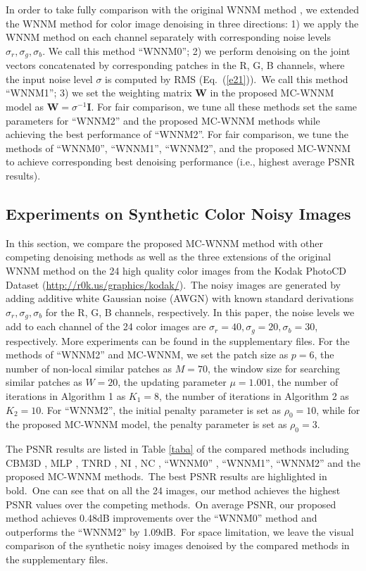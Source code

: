 \documentclass[10pt,twocolumn,letterpaper,sort&compress]{article}
\begin{document}
In order to take fully comparison with the original WNNM method \cite{wnnmijcv}, we extended the WNNM method \cite{wnnmijcv} for color image denoising in three directions: 1) we apply the WNNM method \cite{wnnmijcv} on each channel separately with corresponding noise levels $\sigma_{r}, \sigma_{g}, \sigma_{b}$. We call this method ``WNNM0''; 2) we perform denoising on the joint vectors concatenated by corresponding patches in the R, G, B channels, where the input noise level $\sigma$ is computed by RMS (Eq.\ (\ref{e21})).\ We call this method ``WNNM1''; 3) we set the weighting matrix $\mathbf{W}$ in the proposed MC-WNNM model as $\mathbf{W}=\sigma^{-1}\mathbf{I}$. For fair comparison, we tune all these methods set the same parameters for ``WNNM2'' and the proposed MC-WNNM methods while achieving the best performance of ``WNNM2''. For fair comparison, we tune the methods of ``WNNM0'', ``WNNM1'', ``WNNM2'', and the proposed MC-WNNM to achieve corresponding best denoising performance (i.e., highest average PSNR results). 

\subsection{Experiments on Synthetic Color Noisy Images}
In this section, we compare the proposed MC-WNNM method with other competing denoising methods \cite{cbm3d,mlp,chen2015learning,noiseclinic,neatimage} as well as the three extensions of the original WNNM method \cite{wnnmijcv} on the 24 high quality color images from the Kodak PhotoCD Dataset (\url{http://r0k.us/graphics/kodak/}).\ The noisy images are generated by adding additive white Gaussian noise (AWGN) with known standard derivations $\sigma_{r}, \sigma_{g}, \sigma_{b}$ for the R, G, B channels, respectively. In this paper, the noise levels we add to each channel of the 24 color images are $\sigma_{r}=40, \sigma_{g}=20, \sigma_{b}=30$, respectively. More experiments can be found in the supplementary files. For the methods of ``WNNM2'' and MC-WNNM, we set the patch size as $p = 6$, the number of non-local similar patches as $M = 70$, the window size for searching similar patches as $W = 20$, the updating parameter $\mu=1.001$, the number of iterations in Algorithm 1 as $K_{1} = 8$, the number of iterations in Algorithm 2 as $K_{2}=10$. For ``WNNM2'', the initial penalty parameter is set as $\rho_{0}=10$, while for the proposed MC-WNNM model, the penalty parameter is set as $\rho_{0}=3$.

The PSNR results are listed in Table \ref{taba} of the compared methods including CBM3D \cite{cbm3d}, MLP \cite{mlp}, TNRD \cite{chen2015learning}, NI \cite{neatimage}, NC \cite{noiseclinic,ncwebsite}, ``WNNM0'' \cite{wnnmijcv}, ``WNNM1'', ``WNNM2'' and the proposed MC-WNNM methods.\ The best PSNR results are highlighted in bold.\ One can see that on all the 24 images, our method achieves the highest PSNR values over the competing methods.\ On average PSNR, our proposed method achieves 0.48dB improvements over the ``WNNM0'' method and outperforms the ``WNNM2'' by 1.09dB.\ For space limitation, we leave the visual comparison of the synthetic noisy images denoised by the compared methods in the supplementary files.
\end{document}
